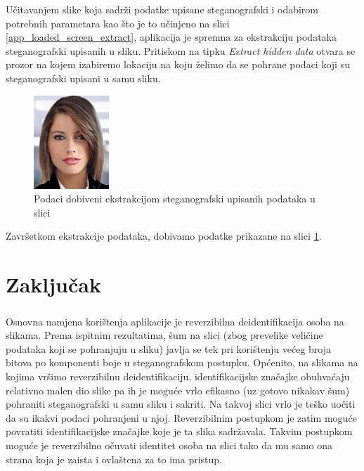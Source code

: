 \documentclass[times, utf8, seminar]{fer}
\begin{document}
Učitavanjem slike koja sadrži podatke upisane steganografski i odabirom potrebnih parametara kao što je to učinjeno na slici \ref{app_loaded_screen_extract}, aplikacija je spremna za ekstrakciju podataka steganografski upisanih u sliku. Pritiskom na tipku \textit{Extract hidden data} otvara se prozor na kojem izabiremo lokaciju na koju želimo da se pohrane podaci koji su steganografski upisani u samu sliku.

\begin{figure}[H]
\caption{Podaci dobiveni ekstrakcijom steganografski upisanih podataka u slici}
\label{extracted_stego_data}
\centerline{\includegraphics[scale=0.6]{images/extracted_stego_data.png}}
\end{figure}

Završetkom ekstrakcije podataka, dobivamo podatke prikazane na slici \ref{extracted_stego_data}. 

\chapter{Zaključak}

\paragraph{}
Osnovna namjena korištenja aplikacije je reverzibilna deidentifikacija osoba na slikama. Prema ispitnim rezultatima, šum na slici (zbog prevelike veličine podataka koji se pohranjuju u sliku) javlja se tek pri korištenju većeg broja bitova po komponenti boje u steganografskom postupku. Općenito, na slikama na kojima vršimo reverzibilnu deidentifikaciju, identifikacijske značajke obuhvaćaju relativno malen dio slike pa ih je moguće vrlo efikasno (uz gotovo nikakav šum) pohraniti steganografski u samu sliku i sakriti. Na takvoj slici vrlo je teško uočiti da su ikakvi podaci pohranjeni u njoj. Reverzibilnim postupkom je zatim moguće povratiti identifikacijske značajke koje je ta slika sadržavala. Takvim postupkom moguće je reverzibilno očuvati identitet osoba na slici tako da mu samo ona strana koja je zaista i ovlaštena za to ima pristup. 
\end{document}
